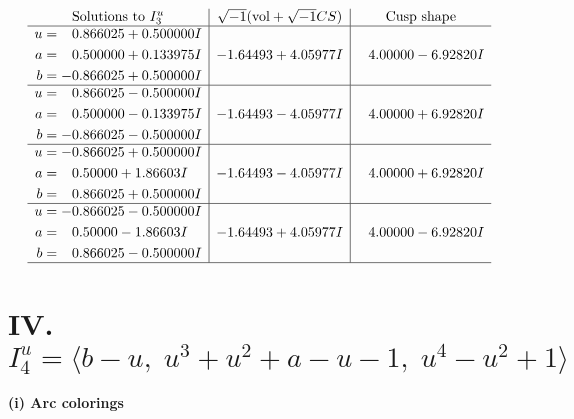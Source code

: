 \documentclass[1p]{elsarticle_modified}
\theoremstyle{definition}
\newcommand{\I}{\sqrt{-1}}
\begin{document}
$$\begin{array}{c|c|c}  
\text{Solutions to }I^u_{3}& \I (\text{vol} + \sqrt{-1}CS) & \text{Cusp shape}\\
 \hline 
\begin{aligned}
u &= \phantom{-}0.866025 + 0.500000 I \\
a &= \phantom{-}0.500000 + 0.133975 I \\
b &= -0.866025 + 0.500000 I\end{aligned}
 & -1.64493 + 4.05977 I & \phantom{-}4.00000 - 6.92820 I \\ \hline\begin{aligned}
u &= \phantom{-}0.866025 - 0.500000 I \\
a &= \phantom{-}0.500000 - 0.133975 I \\
b &= -0.866025 - 0.500000 I\end{aligned}
 & -1.64493 - 4.05977 I & \phantom{-}4.00000 + 6.92820 I \\ \hline\begin{aligned}
u &= -0.866025 + 0.500000 I \\
a &= \phantom{-}0.50000 + 1.86603 I \\
b &= \phantom{-}0.866025 + 0.500000 I\end{aligned}
 & -1.64493 - 4.05977 I & \phantom{-}4.00000 + 6.92820 I \\ \hline\begin{aligned}
u &= -0.866025 - 0.500000 I \\
a &= \phantom{-}0.50000 - 1.86603 I \\
b &= \phantom{-}0.866025 - 0.500000 I\end{aligned}
 & -1.64493 + 4.05977 I & \phantom{-}4.00000 - 6.92820 I\\
 \hline 
 \end{array}$$\newpage\newpage\renewcommand{\arraystretch}{1}
\centering \section*{IV. $I^u_{4}= \langle b- u,\;u^3+u^2+a- u-1,\;u^4- u^2+1 \rangle$}
\flushleft \textbf{(i) Arc colorings}\\
\end{document}
